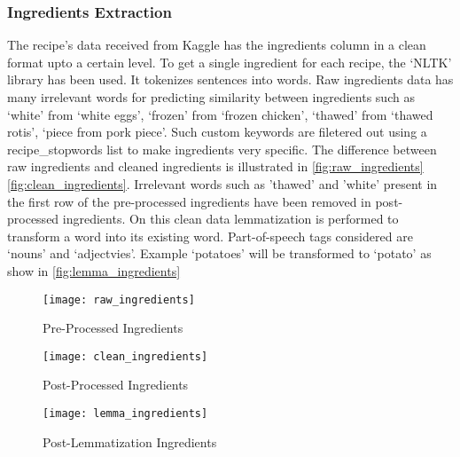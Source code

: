 \subsubsection{Ingredients Extraction}
The recipe's data received from Kaggle has the ingredients column in a clean format upto a certain level. To get a single ingredient for each recipe, the `NLTK' library has been used. It tokenizes sentences into words. Raw ingredients data has many irrelevant words for predicting similarity between ingredients such as `white' from `white eggs', `frozen' from `frozen chicken', `thawed' from `thawed rotis', `piece from pork piece'. Such custom keywords are filetered out using a recipe\_stopwords list to make ingredients very specific. The difference between raw ingredients and cleaned ingredients is illustrated in \autoref{fig:raw_ingredients} \autoref{fig:clean_ingredients}. Irrelevant words such as 'thawed' and 'white' present in the first row of the pre-processed ingredients have been removed in post-processed ingredients. On this clean data lemmatization is performed to transform a word into its existing word. Part-of-speech tags considered are `nouns' and `adjectvies'. Example `potatoes' will be transformed to `potato' as show in \autoref{fig:lemma_ingredients}

\begin{singlespace}
\begin{figure}[H]
	\centering
	\texttt{[image: raw\_ingredients]}
	\caption{Pre-Processed Ingredients }
	\label{fig:raw_ingredients}
\end{figure}  
\end{singlespace}
\begin{singlespace}
\begin{figure}[H]
	\centering
	\texttt{[image: clean\_ingredients]}
	\caption{Post-Processed Ingredients }
	\label{fig:clean_ingredients}
\end{figure}  
\end{singlespace}
\begin{singlespace}
\begin{figure}[H]
	\centering
	\texttt{[image: lemma\_ingredients]}
	\caption{Post-Lemmatization Ingredients }
	\label{fig:lemma_ingredients}
\end{figure}  
\end{singlespace}

